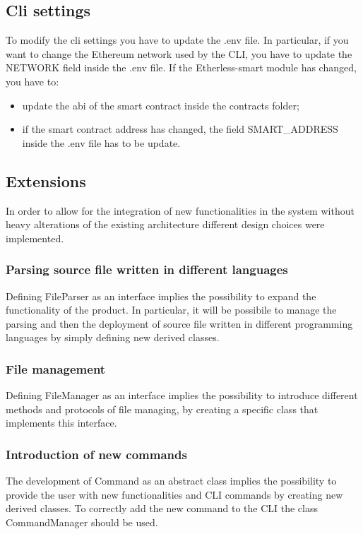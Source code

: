 \subsection{Cli settings}
To modify the cli settings you have to update the .env file. In particular, if you want to change the Ethereum network used by the CLI, you have to update the NETWORK field inside the .env file. 
If the Etherless-smart module has changed, you have to:
\begin{itemize}
	\item update the abi of the smart contract inside the contracts folder;
	\item if the smart contract address has changed, the field SMART\_ADDRESS inside the .env file has to be update.
\end{itemize}
	
\subsection{Extensions}  
In order to allow for the integration of new functionalities in the system without heavy alterations of the existing architecture different design choices were implemented.

\subsubsection{Parsing source file written in different languages}
Defining FileParser as an interface implies the possibility to expand the functionality of the product. In particular, it will be possibile to manage the parsing and then the deployment of source file written in different programming languages by simply defining new derived classes. 

\subsubsection{File management}
Defining FileManager as an interface implies the possibility to introduce different methods and protocols of file managing, by creating a specific class that implements this interface. 

\subsubsection{Introduction of new commands}
The development of Command as an abstract class implies the possibility to provide the user with new functionalities and CLI commands by creating new derived classes. To correctly add the new command to the CLI the class CommandManager should be used.

